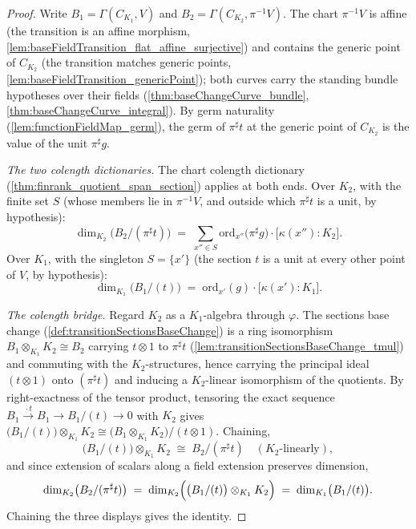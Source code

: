 \begin{proof}
  \leanok
  Write \(B_1 = \Gamma(C_{K_1}, V)\) and
  \(B_2 = \Gamma(C_{K_2}, \pi^{-1}V)\). The chart \(\pi^{-1}V\) is affine (the
  transition is an affine morphism,
  \ref{lem:baseFieldTransition_flat_affine_surjective}) and contains the generic point
  of \(C_{K_2}\) (the transition matches generic points,
  \ref{lem:baseFieldTransition_genericPoint}); both curves carry the standing bundle
  hypotheses over their fields (\ref{thm:baseChangeCurve_bundle},
  \ref{thm:baseChangeCurve_integral}). By germ naturality
  (\ref{lem:functionFieldMap_germ}), the germ of \(\pi^{\sharp}t\) at the generic point
  of \(C_{K_2}\) is the value of the unit \(\pi^{\sharp}g\).

  \emph{The two colength dictionaries.} The chart colength dictionary
  (\ref{thm:finrank_quotient_span_section}) applies at both ends. Over \(K_2\), with
  the finite set \(S\) (whose members lie in \(\pi^{-1}V\), and outside which
  \(\pi^{\sharp}t\) is a unit, by hypothesis):
  \[
    \dim_{K_2}\bigl(B_2/(\pi^{\sharp}t)\bigr)
      \;=\; \sum_{x'' \in S} \mathrm{ord}_{x''}\bigl(\pi^{\sharp}g\bigr)
        \cdot \bigl[\kappa(x'') : K_2\bigr].
  \]
  Over \(K_1\), with the singleton \(S = \{x'\}\) (the section \(t\) is a unit at every
  other point of \(V\), by hypothesis):
  \[
    \dim_{K_1}\bigl(B_1/(t)\bigr)
      \;=\; \mathrm{ord}_{x'}(g) \cdot \bigl[\kappa(x') : K_1\bigr].
  \]

  \emph{The colength bridge.} Regard \(K_2\) as a \(K_1\)-algebra through \(\varphi\).
  The sections base change (\ref{def:transitionSectionsBaseChange}) is a ring
  isomorphism \(B_1 \otimes_{K_1} K_2 \cong B_2\) carrying \(t \otimes 1\) to
  \(\pi^{\sharp}t\) (\ref{lem:transitionSectionsBaseChange_tmul}) and commuting with
  the \(K_2\)-structures, hence carrying the principal ideal \((t \otimes 1)\) onto
  \((\pi^{\sharp}t)\) and inducing a \(K_2\)-linear isomorphism of the quotients. By
  right-exactness of the tensor product, tensoring the exact sequence
  \(B_1 \xrightarrow{\,\cdot t\,} B_1 \to B_1/(t) \to 0\) with \(K_2\) gives
  \(\bigl(B_1/(t)\bigr) \otimes_{K_1} K_2 \cong
  \bigl(B_1 \otimes_{K_1} K_2\bigr)/(t \otimes 1)\). Chaining,
  \[
    \bigl(B_1/(t)\bigr) \otimes_{K_1} K_2 \;\cong\; B_2/(\pi^{\sharp}t)
    \quad (K_2\text{-linearly}),
  \]
  and since extension of scalars along a field extension preserves dimension,
  \[
    \dim_{K_2}\bigl(B_2/(\pi^{\sharp}t)\bigr)
      \;=\; \dim_{K_2}\Bigl(\bigl(B_1/(t)\bigr) \otimes_{K_1} K_2\Bigr)
      \;=\; \dim_{K_1}\bigl(B_1/(t)\bigr).
  \]
  Chaining the three displays gives the identity.
\end{proof}

